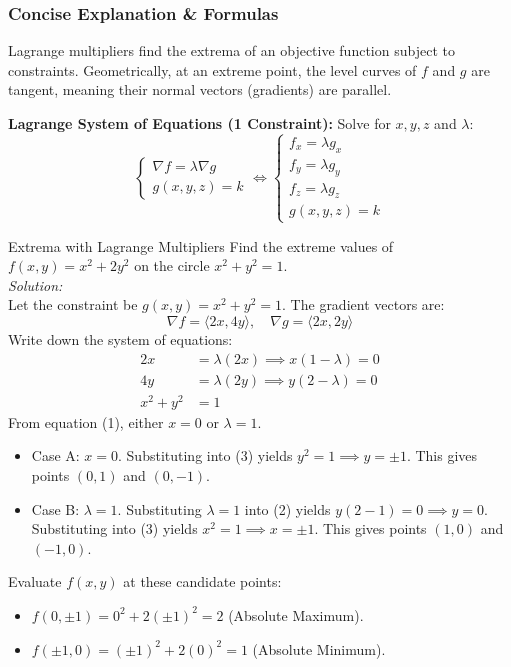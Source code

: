 \documentclass[11pt]{article}
\begin{document}
\subsubsection*{Concise Explanation \& Formulas}
Lagrange multipliers find the extrema of an objective function subject to constraints. Geometrically, at an extreme point, the level curves of $f$ and $g$ are tangent, meaning their normal vectors (gradients) are parallel.
\begin{formulabox}
    \textbf{Lagrange System of Equations (1 Constraint):} Solve for $x, y, z$ and $\lambda$:
    \[ \begin{cases} \nabla f = \lambda \nabla g \\ g(x,y,z) = k \end{cases} \iff \begin{cases} f_x = \lambda g_x \\ f_y = \lambda g_y \\ f_z = \lambda g_z \\ g(x,y,z) = k \end{cases} \]
\end{formulabox}

\begin{examplebox}{Extrema with Lagrange Multipliers}
    Find the extreme values of $f(x,y) = x^2 + 2y^2$ on the circle $x^2 + y^2 = 1$.\\
    \textit{Solution:}\\
    Let the constraint be $g(x,y) = x^2 + y^2 = 1$. The gradient vectors are:
    \[ \nabla f = \langle 2x, 4y \rangle, \quad \nabla g = \langle 2x, 2y \rangle \]
    Write down the system of equations:
    \begin{align}
        2x &= \lambda (2x) \implies x(1 - \lambda) = 0 \\
        4y &= \lambda (2y) \implies y(2 - \lambda) = 0 \\
        x^2 + y^2 &= 1
    \end{align}
    From equation (1), either $x = 0$ or $\lambda = 1$.
    \begin{itemize}
        \item Case A: $x = 0$. Substituting into (3) yields $y^2 = 1 \implies y = \pm 1$. This gives points $(0, 1)$ and $(0, -1)$.
        \item Case B: $\lambda = 1$. Substituting $\lambda = 1$ into (2) yields $y(2-1) = 0 \implies y = 0$. Substituting into (3) yields $x^2 = 1 \implies x = \pm 1$. This gives points $(1,0)$ and $(-1,0)$.
    \end{itemize}
    Evaluate $f(x,y)$ at these candidate points:
    \begin{itemize}
        \item $f(0, \pm 1) = 0^2 + 2(\pm 1)^2 = 2$ (Absolute Maximum).
        \item $f(\pm 1, 0) = (\pm 1)^2 + 2(0)^2 = 1$ (Absolute Minimum).
    \end{itemize}
\end{examplebox}
\end{document}
